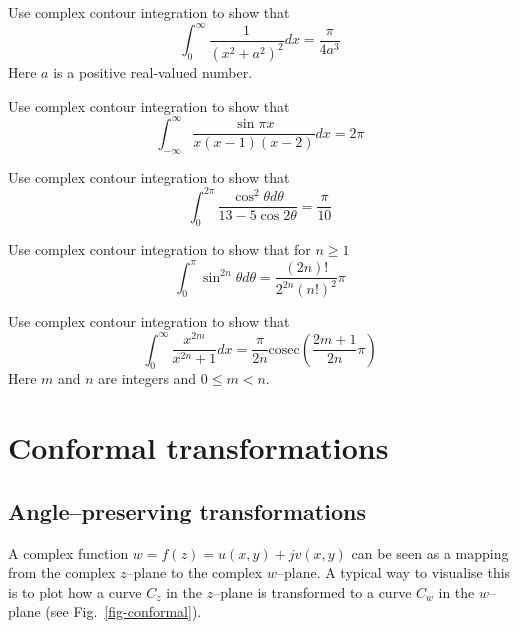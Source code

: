 \begin{sidebar}
\begin{ex}
Use complex contour integration to show that
$$ \int_0^{\infty} \frac{1}{\left(x^2 + a^2\right)^2} dx = \frac{\pi}{4 a^3}$$
Here $a$ is a positive real-valued number.
\end{ex}
\end{sidebar}

\begin{sidebar}
\begin{ex}
Use complex contour integration to show that
$$ \int_{-\infty}^{\infty} \frac{\sin \pi x}{x (x-1) (x-2)} dx = 2 \pi$$
\end{ex}
\end{sidebar}

\begin{sidebar}
\begin{ex}
Use complex contour integration to show that
$$ \int_0^{2\pi} \frac{\cos^2 \theta d \theta}{13-5\cos 2 \theta} = \frac{\pi}{10}$$
\end{ex}
\end{sidebar}

\begin{sidebar}
\begin{ex}
Use complex contour integration to show that for $n \ge 1$
$$ \int_0^\pi \sin^{2n} \theta d \theta = \frac{(2n)!}{ 2^{2n}(n!)^2} \pi$$
\end{ex}
\end{sidebar}

\begin{sidebar}
\begin{ex}
Use complex contour integration to show that
$$ \int_0^\infty \frac{x ^ {2m}}{x^{2n} + 1} dx = \frac{\pi}{2n} \mathrm{cosec}  \left( \frac{2m+1}{2n} \pi \right)$$
Here $m$ and $n$ are integers and $0 \le m < n$.
\end{ex}
\end{sidebar}



\section{Conformal transformations}

\subsection{Angle--preserving transformations}

A complex function $w = f(z) = u(x,y)+jv(x,y)$ can be seen as a mapping from the
complex $z$--plane to the complex $w$--plane. A typical way to visualise this is
to plot how a curve $C_z$ in the $z$--plane is transformed to a curve $C_w$ in
the $w$--plane (see Fig.~\ref{fig-conformal}).

